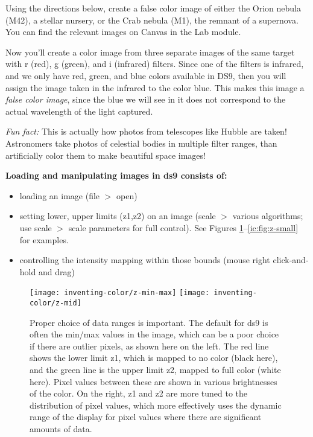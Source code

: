 \begin{steps}
	\item\label{ic:step:color-image} Using the directions below, create a
	false color image of either the Orion nebula (M42), a stellar nursery, or the
	Crab nebula (M1), the remnant of a supernova. You can find the relevant images
	on Canvas in the Lab module.  \end{steps}

Now you'll create a color image from three separate images of the same target with r (red), g (green), and i (infrared) filters. Since one of the filters is infrared, and we only have red, green, and blue colors available in DS9, then you will assign the image taken in the infrared to the color blue. This makes this image a \textit{false color image}, since the blue we will see in it does not correspond to the actual wavelength of the light captured.

\begin{framed}
	\emph{Fun fact:}
	This is actually how photos from telescopes like Hubble are taken! Astronomers
	take photos of celestial bodies in multiple filter ranges, than artificially
	color them to make beautiful space images!
\end{framed}


\textbf{Loading and manipulating images in ds9 consists of:}
\begin{itemize}
\item loading an image  (file $>$ open)
\item setting lower, upper limits (z1,z2) on an image  (scale $>$ various algorithms; use scale $>$ scale parameters for full control). See Figures \ref{ic:fig:z-min-max}--\ref{ic:fig:z-small} for examples.
\item controlling the intensity mapping within those bounds (mouse right click-and-hold and drag)
\end{itemize}

\begin{figure}
	\texttt{[image: inventing-color/z-min-max]}
	\texttt{[image: inventing-color/z-mid]}
	\caption{Proper choice of data ranges is important. The default for ds9 is often the min/max values in the image, which can be a poor choice if there are outlier pixels, as shown here on the left. The red line shows the lower limit z1, which is mapped to no color (black here), and the green line is the upper limit z2, mapped to full color (white here). Pixel values between these are shown in various brightnesses of the color. On the right, z1 and z2 are more tuned to the distribution of pixel values, which more effectively uses the dynamic range of the display for pixel values where there are significant amounts of data.}\label{ic:fig:z-min-max}
\end{figure}

